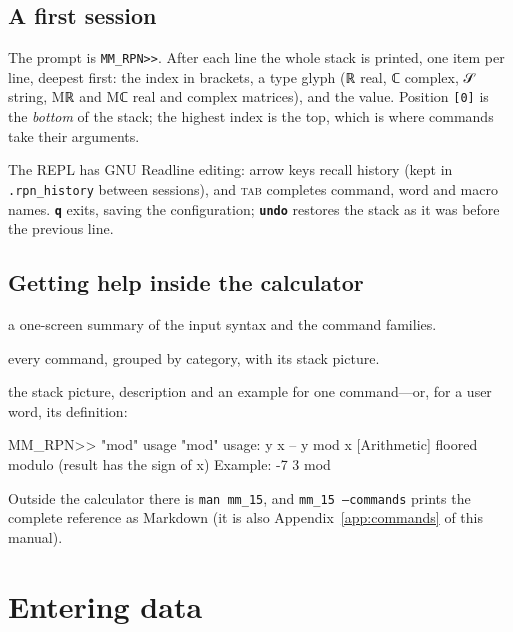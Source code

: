\documentclass[11pt,letterpaper]{article}
\newcommand{\code}[1]{\texttt{#1}}
\newcommand{\g}[1]{{\mathglyphs #1}}   %
\newcommand{\cmd}[1]{\texttt{\textbf{#1}}}
\begin{document}
\subsection{A first session}


The prompt is \code{MM\_RPN>>}. After each line the whole stack is printed, one item per line, deepest first: the index in brackets, a type glyph (\g{ℝ} real, \g{ℂ} complex, \g{𝒮} string, M\g{ℝ} and M\g{ℂ} real and complex matrices), and the value. Position \code{[0]} is the \emph{bottom} of the stack; the highest index is the top, which is where commands take their arguments.

The REPL has GNU Readline editing: arrow keys recall history (kept in \code{.rpn\_history} between sessions), and \textsc{tab} completes command, word and macro names. \cmd{q} exits, saving the configuration; \cmd{undo} restores the stack as it was before the previous line.

\subsection{Getting help inside the calculator}

\begin{description}[style=nextline,leftmargin=1.5em]
  \item[\cmd{help}] a one-screen summary of the input syntax and the command families.
  \item[\cmd{listfcns}] every command, grouped by category, with its stack picture.
  \item[\cmd{"name" usage}] the stack picture, description and an example for one command---or, for a user word, its definition:
\end{description}
\begin{rpn}
MM_RPN>> "mod" usage
"mod" usage: y x -- y mod x   [Arithmetic]
    floored modulo (result has the sign of x)
    Example: -7 3 mod
\end{rpn}
Outside the calculator there is \code{man mm\_15}, and \code{mm\_15 --commands} prints the complete reference as Markdown (it is also Appendix~\ref{app:commands} of this manual).

\section{Entering data}
\end{document}
